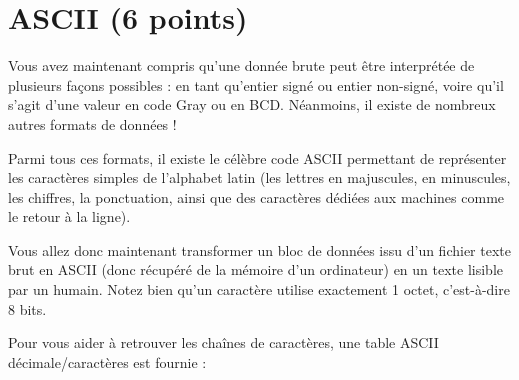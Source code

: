 \documentclass[11pt,a4paper]{article}
\begin{document}
\section{ASCII (6 points)}

\noindent Vous avez maintenant compris qu'une donnée brute peut être interprétée de plusieurs façons possibles : en tant qu'entier signé ou entier non-signé, voire qu'il s'agit d'une valeur en code Gray ou en BCD.
Néanmoins, il existe de nombreux autres formats de données !

\noindent Parmi tous ces formats, il existe le célèbre code ASCII permettant de représenter les caractères simples de l'alphabet latin (les lettres en majuscules, en minuscules, les chiffres, la ponctuation, ainsi que des caractères dédiées aux machines comme le retour à la ligne).

\medskip

\noindent Vous allez donc maintenant transformer un bloc de données issu d'un fichier texte brut en ASCII (donc récupéré de la mémoire d'un ordinateur) en un texte lisible par un humain.
Notez bien qu'un caractère utilise exactement 1 octet, c'est-à-dire 8 bits.

\bigskip

\noindent Pour vous aider à retrouver les chaînes de caractères, une table ASCII décimale/caractères est fournie :
\end{document}
